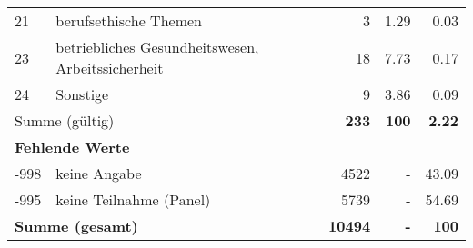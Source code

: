 \begin{longtable}{lXrrr}
        21 & \multicolumn{1}{X}{berufsethische Themen} & %
          \num{3} &
          \num[round-mode=places,round-precision=2]{1,29} &
          \num[round-mode=places,round-precision=2]{0,03} \\

        23 & \multicolumn{1}{X}{betriebliches Gesundheitswesen, Arbeitssicherheit} & %
          \num{18} &
          \num[round-mode=places,round-precision=2]{7,73} &
          \num[round-mode=places,round-precision=2]{0,17} \\

        24 & \multicolumn{1}{X}{Sonstige} & %
          \num{9} &
          \num[round-mode=places,round-precision=2]{3,86} &
          \num[round-mode=places,round-precision=2]{0,09} \\

     \midrule
     \multicolumn{2}{l}{Summe (gültig)} &
       \textbf{\num{233}} &
     \textbf{100} &
       \textbf{\num[round-mode=places,round-precision=2]{2,22}} \\
     \multicolumn{5}{l}{\textbf{Fehlende Werte}}\\
       -998 &
       keine Angabe &
         \num{4522} &
        - &
         \num[round-mode=places,round-precision=2]{43,09} \\
       -995 &
       keine Teilnahme (Panel) &
         \num{5739} &
        - &
         \num[round-mode=places,round-precision=2]{54,69} \\
     \midrule
     \multicolumn{2}{l}{\textbf{Summe (gesamt)}} &
          \textbf{\num{10494}} &
        \textbf{-} &
        \textbf{100} \\
     \bottomrule
     \end{longtable}
     
